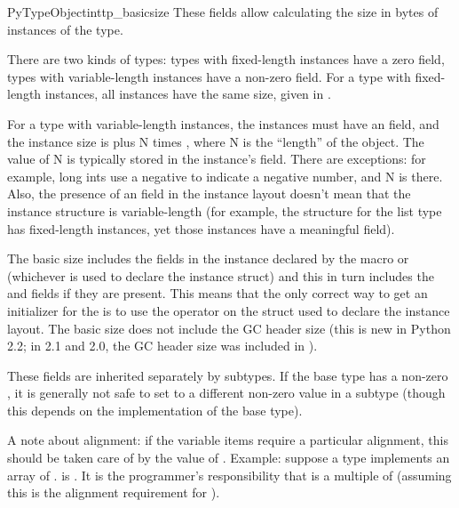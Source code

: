 \begin{cmemberdesc}{PyTypeObject}{int}{tp_basicsize}
  These fields allow calculating the size in bytes of instances of
  the type.

  There are two kinds of types: types with fixed-length instances have
  a zero  field, types with variable-length
  instances have a non-zero  field.  For a type
  with fixed-length instances, all instances have the same size,
  given in .

  For a type with variable-length instances, the instances must have
  an  field, and the instance size is
   plus N times , where N is
  the ``length'' of the object.  The value of N is typically stored in
  the instance's  field.  There are exceptions:  for
  example, long ints use a negative  to indicate a
  negative number, and N is  there.  Also,
  the presence of an  field in the instance layout
  doesn't mean that the instance structure is variable-length (for
  example, the structure for the list type has fixed-length instances,
  yet those instances have a meaningful  field).

  The basic size includes the fields in the instance declared by the
  macro  or
   (whichever is used to declare the
  instance struct) and this in turn includes the  and
   fields if they are present.  This means that the
  only correct way to get an initializer for the 
  is to use the  operator on the struct used to
  declare the instance layout.  The basic size does not include the GC
  header size (this is new in Python 2.2; in 2.1 and 2.0, the GC
  header size was included in ).

  These fields are inherited separately by subtypes.  If the base type
  has a non-zero , it is generally not safe to set
   to a different non-zero value in a subtype
  (though this depends on the implementation of the base type).

  A note about alignment: if the variable items require a particular
  alignment, this should be taken care of by the value of
  .  Example: suppose a type implements an array
  of .  is .
  It is the programmer's responsibility that  is
  a multiple of  (assuming this is the alignment
  requirement for ).
\end{cmemberdesc}

